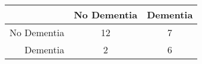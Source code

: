 \begin{table}[ht]
\centering
\begin{tabular}{r|c|c}
  \hline
 & No Dementia & Dementia \\ 
  \hline
No Dementia & 12 & 7 \\ 
  Dementia & 2 & 6 \\ 
   \hline
\end{tabular}
\end{table}
